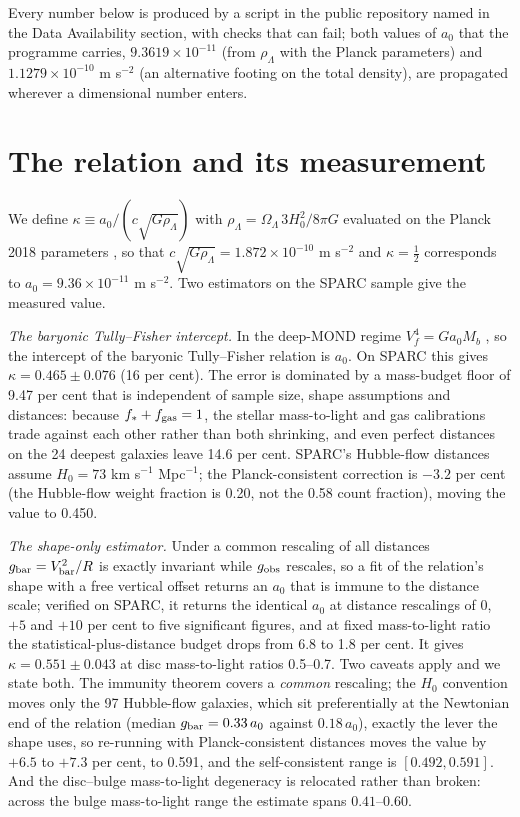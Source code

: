 \documentclass[fleqn,usenatbib]{mnras}
\begin{document}
Every number below is produced by a script in the public repository named in the Data Availability section, with checks that can fail; both values of $a_0$ that the programme carries, $9.3619\times10^{-11}$ (from $\rho_\Lambda$ with the Planck parameters) and $1.1279\times10^{-10}$ m s$^{-2}$ (an alternative footing on the total density), are propagated wherever a dimensional number enters.

\section{The relation and its measurement}
\label{sec:meas}
We define $\kappa\equiv a_0/(c\sqrt{G\rho_\Lambda})$ with $\rho_\Lambda=\Omega_\Lambda\,3H_0^2/8\pi G$ evaluated on the Planck 2018 parameters \citep[$H_0=67.4$ km s$^{-1}$ Mpc$^{-1}$, $\Omega_\Lambda=0.685$;][]{Planck2020}, so that $c\sqrt{G\rho_\Lambda}=1.872\times10^{-10}$ m s$^{-2}$ and $\kappa=\tfrac12$ corresponds to $a_0=9.36\times10^{-11}$ m s$^{-2}$. Two estimators on the SPARC sample \citep[175 galaxies, 2803 quality points;][]{Lelli2016} give the measured value.

\emph{The baryonic Tully--Fisher intercept.} In the deep-MOND regime $V_f^4=Ga_0M_b$ \citep{McGaugh2012}, so the intercept of the baryonic Tully--Fisher relation is $a_0$. On SPARC this gives $\kappa=0.465\pm0.076$ (16 per cent). The error is dominated by a mass-budget floor of 9.47 per cent that is independent of sample size, shape assumptions and distances: because $f_*+f_{\rm gas}=1$, the stellar mass-to-light and gas calibrations trade against each other rather than both shrinking, and even perfect distances on the 24 deepest galaxies leave 14.6 per cent. SPARC's Hubble-flow distances assume $H_0=73$ km s$^{-1}$ Mpc$^{-1}$; the Planck-consistent correction is $-3.2$ per cent (the Hubble-flow weight fraction is 0.20, not the 0.58 count fraction), moving the value to 0.450.

\emph{The shape-only estimator.} Under a common rescaling of all distances $g_{\rm bar}=V_{\rm bar}^2/R$ is exactly invariant while $g_{\rm obs}$ rescales, so a fit of the relation's shape with a free vertical offset returns an $a_0$ that is immune to the distance scale; verified on SPARC, it returns the identical $a_0$ at distance rescalings of $0$, $+5$ and $+10$ per cent to five significant figures, and at fixed mass-to-light ratio the statistical-plus-distance budget drops from 6.8 to 1.8 per cent. It gives $\kappa=0.551\pm0.043$ at disc mass-to-light ratios 0.5--0.7. Two caveats apply and we state both. The immunity theorem covers a \emph{common} rescaling; the $H_0$ convention moves only the 97 Hubble-flow galaxies, which sit preferentially at the Newtonian end of the relation (median $g_{\rm bar}=0.33\,a_0$ against $0.18\,a_0$), exactly the lever the shape uses, so re-running with Planck-consistent distances moves the value by $+6.5$ to $+7.3$ per cent, to 0.591, and the self-consistent range is $[0.492,0.591]$. And the disc--bulge mass-to-light degeneracy is relocated rather than broken: across the bulge mass-to-light range the estimate spans $0.41$--$0.60$.
\end{document}
